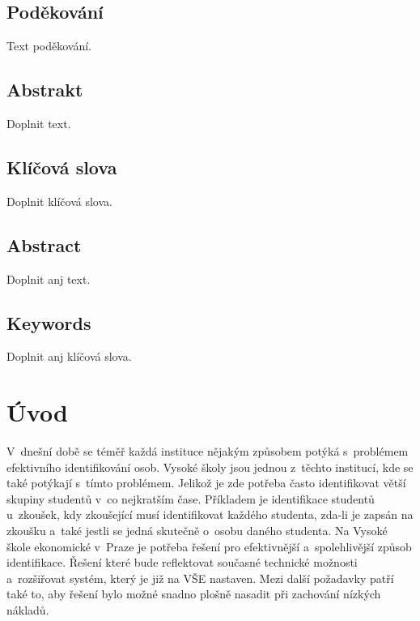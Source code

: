 \documentclass[12pt, a4paper]{report}
\begin{document}
	\clearpage\mbox{}\clearpage %
	
	\vspace*{\fill}
	\section*{Poděkování}
	\noindent Text poděkování.
	
	\clearpage\mbox{}\clearpage %
	
	\section*{Abstrakt}
	Doplnit text.
	
	\section*{Klíčová slova}
	Doplnit klíčová slova.
	
	\clearpage\mbox{}\clearpage %
	
	\section*{Abstract}
	Doplnit anj text.
	
	\section*{Keywords}
	Doplnit anj klíčová slova.
	
	\clearpage\mbox{}\clearpage %
	
	\tableofcontents %
	\renewcommand{\thepage}{\arabic{page}} %
	\renewcommand{\baselinestretch}{1.5} %
	
	\normalsize %
	
	\chapter*{Úvod}
	\pagestyle{plain} %
	\setcounter{page}{1} %
	V~dnešní době se téměř každá instituce nějakým způsobem potýká s~problémem efektivního identifikování osob. 
	Vysoké školy jsou jednou z~těchto institucí, kde se také potýkají s~tímto problémem. Jelikož je zde potřeba často identifikovat větší skupiny studentů v~co nejkratším čase.
	Příkladem je identifikace studentů u~zkoušek, kdy zkoušející musí identifikovat každého studenta, 
	zda-li je zapsán na zkoušku a~také jestli se jedná skutečně o~osobu daného studenta.
	Na Vysoké škole ekonomické v~Praze je potřeba řešení pro efektivnější a~spolehlivější způsob identifikace. Řešení které bude reflektovat současné technické možnosti
a~rozšiřovat systém, který je již na VŠE nastaven. Mezi další požadavky patří také to, aby řešení bylo možné snadno plošně nasadit při zachování nízkých nákladů.
	\\
	
\end{document}
